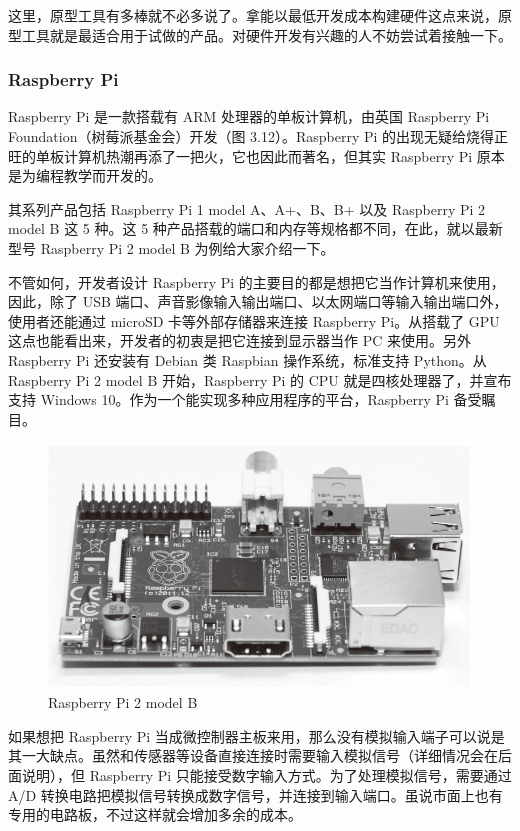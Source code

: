 \documentclass[12pt,UTF8]{ctexbook}
\begin{document}
这里，原型工具有多棒就不必多说了。拿能以最低开发成本构建硬件这点来说，原型工具就是最适合用于试做的产品。对硬件开发有兴趣的人不妨尝试着接触一下。

\subsubsection{Raspberry Pi}

Raspberry Pi 是一款搭载有 ARM 处理器的单板计算机，由英国 Raspberry Pi Foundation（树莓派基金会）开发（图 3.12）。Raspberry Pi 的出现无疑给烧得正旺的单板计算机热潮再添了一把火，它也因此而著名，但其实 Raspberry Pi 原本是为编程教学而开发的。

其系列产品包括 Raspberry Pi 1 model A、A+、B、B+ 以及 Raspberry Pi 2 model B 这 5 种。这 5 种产品搭载的端口和内存等规格都不同，在此，就以最新型号 Raspberry Pi 2 model B 为例给大家介绍一下。

不管如何，开发者设计 Raspberry Pi 的主要目的都是想把它当作计算机来使用，因此，除了 USB 端口、声音影像输入输出端口、以太网端口等输入输出端口外，使用者还能通过 microSD 卡等外部存储器来连接 Raspberry Pi。从搭载了 GPU 这点也能看出来，开发者的初衷是把它连接到显示器当作 PC 来使用。另外 Raspberry Pi 还安装有 Debian 类
Raspbian 操作系统，标准支持 Python。从 Raspberry Pi 2 model B 开始，Raspberry Pi 的 CPU 就是四核处理器了，并宣布支持 Windows 10。作为一个能实现多种应用程序的平台，Raspberry Pi 备受瞩目。

\begin{figure}[htbp]
	\centering
	\includegraphics[width=1\linewidth]{63}
	\caption{Raspberry Pi 2 model B}
	\label{fig:1}
\end{figure}

如果想把 Raspberry Pi 当成微控制器主板来用，那么没有模拟输入端子可以说是其一大缺点。虽然和传感器等设备直接连接时需要输入模拟信号（详细情况会在后面说明），但 Raspberry Pi 只能接受数字输入方式。为了处理模拟信号，需要通过 A/D 转换电路把模拟信号转换成数字信号，并连接到输入端口。虽说市面上也有专用的电路板，不过这样就会增加多余的成本。
\end{document}
